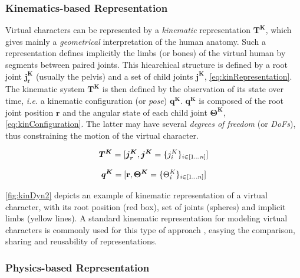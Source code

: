 			\subsubsection{Kinematics-based Representation}
			\label{subsubsec:CA_VCM_Kinematic}

Virtual characters can be represented by a \emph{kinematic} representation $\boldsymbol{T^K}$, which gives mainly a \emph{geometrical} interpretation of the human anatomy. Such a representation defines implicitly the limbs (or bones) of the virtual human by segments between paired joints. This hiearchical structure is defined by a root joint $\boldsymbol{j^K_r}$ (usually the pelvis) and a set of child joints $\boldsymbol{j^K}$, \myequname \eqref{eq:kinRepresentation}.\\

The kinematic system $\boldsymbol{T^K}$ is then defined by the observation of its state over time, \emph{i.e.} a kinematic configuration (or \emph{pose}) $\boldsymbol{q^K}$. $\boldsymbol{q^K}$ is composed of the root joint position $\boldsymbol{r}$ and the angular state of each child joint $\boldsymbol{\Theta^K}$, \myequname \eqref{eq:kinConfiguration}. The latter may have several \emph{degrees of freedom} (or \emph{DoFs}), thus constraining the motion of the virtual character.

\begin{equation}
	\boldsymbol{T^K} = [\boldsymbol{j^K_r}, \boldsymbol{j^K} = \lbrace j^K_i\rbrace_{i \in [1 \dots n]}]
\label{eq:kinRepresentation}
\eqcaption{Virtual character kinematic representation}
\end{equation}

\vspace{-0.4cm}

\begin{equation}
	\boldsymbol{q^K} = [\textbf{r}, \boldsymbol{\Theta^K} = \lbrace \Theta^K_i\rbrace_{i \in [1 \dots n]}]
\label{eq:kinConfiguration}
\eqcaption{Virtual character kinematic configuration}
\end{equation}

\myfigname \ref{fig:kinDyn2} depicts an example of kinematic representation of a virtual character, with its root position (red box), set of joints (spheres) and implicit limbs (yellow lines). A standard kinematic representation for modeling virtual characters is commonly used for this type of approach , easying the comparison, sharing and reusability of representations.


			\subsubsection{Physics-based Representation}
			\label{subsubsec:CA_VCM_Physic}


